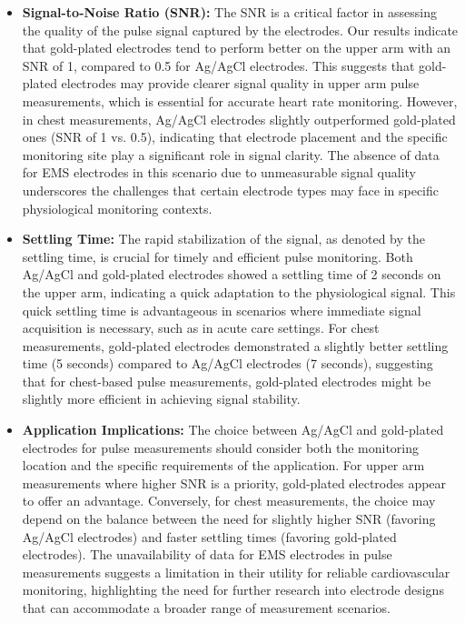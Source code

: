 \documentclass[conference]{IEEEtran}
\begin{document}
\begin{itemize}
    \item \textbf{Signal-to-Noise Ratio (SNR):} The SNR is a critical factor in assessing the quality of the pulse signal captured by the electrodes. Our results indicate that gold-plated electrodes tend to perform better on the upper arm with an SNR of 1, compared to 0.5 for Ag/AgCl electrodes. This suggests that gold-plated electrodes may provide clearer signal quality in upper arm pulse measurements, which is essential for accurate heart rate monitoring. However, in chest measurements, Ag/AgCl electrodes slightly outperformed gold-plated ones (SNR of 1 vs. 0.5), indicating that electrode placement and the specific monitoring site play a significant role in signal clarity. The absence of data for EMS electrodes in this scenario due to unmeasurable signal quality underscores the challenges that certain electrode types may face in specific physiological monitoring contexts.

    \item \textbf{Settling Time:} The rapid stabilization of the signal, as denoted by the settling time, is crucial for timely and efficient pulse monitoring. Both Ag/AgCl and gold-plated electrodes showed a settling time of 2 seconds on the upper arm, indicating a quick adaptation to the physiological signal. This quick settling time is advantageous in scenarios where immediate signal acquisition is necessary, such as in acute care settings. For chest measurements, gold-plated electrodes demonstrated a slightly better settling time (5 seconds) compared to Ag/AgCl electrodes (7 seconds), suggesting that for chest-based pulse measurements, gold-plated electrodes might be slightly more efficient in achieving signal stability.

    \item \textbf{Application Implications:} The choice between Ag/AgCl and gold-plated electrodes for pulse measurements should consider both the monitoring location and the specific requirements of the application. For upper arm measurements where higher SNR is a priority, gold-plated electrodes appear to offer an advantage. Conversely, for chest measurements, the choice may depend on the balance between the need for slightly higher SNR (favoring Ag/AgCl electrodes) and faster settling times (favoring gold-plated electrodes). The unavailability of data for EMS electrodes in pulse measurements suggests a limitation in their utility for reliable cardiovascular monitoring, highlighting the need for further research into electrode designs that can accommodate a broader range of measurement scenarios.
\end{itemize}
\end{document}
